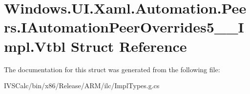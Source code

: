 \hypertarget{struct_windows_1_1_u_i_1_1_xaml_1_1_automation_1_1_peers_1_1_i_automation_peer_overrides5_____impl_1_1_vtbl}{}\section{Windows.\+U\+I.\+Xaml.\+Automation.\+Peers.\+I\+Automation\+Peer\+Overrides5\+\_\+\+\_\+\+Impl.\+Vtbl Struct Reference}
\label{struct_windows_1_1_u_i_1_1_xaml_1_1_automation_1_1_peers_1_1_i_automation_peer_overrides5_____impl_1_1_vtbl}


The documentation for this struct was generated from the following file\+:\begin{DoxyCompactItemize}
\item 
I\+V\+S\+Calc/bin/x86/\+Release/\+A\+R\+M/ilc/Impl\+Types.\+g.\+cs\end{DoxyCompactItemize}
